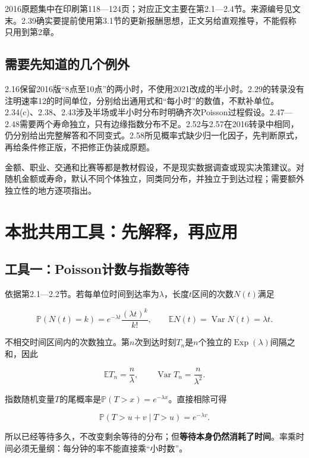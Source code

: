 \documentclass[12pt,a4paper,UTF8,fontset=fandol]{ctexart}
\begin{document}
2016原题集中在印刷第118---124页；对应正文主要在第2.1---2.4节。来源编号见文末。2.39确实要提前使用第3.1节的更新报酬思想，正文另给直观推导，不能假称只用到第2章。

\subsection{需要先知道的几个例外}\label{ux9700ux8981ux5148ux77e5ux9053ux7684ux51e0ux4e2aux4f8bux5916}

2.16保留2016版``8点至10点''的两小时，不使用2021改成的半小时。2.29的转录没有注明速率12的时间单位，分别给出通用式和``每小时''的数值，不默补单位。2.34(c)、2.38、2.43涉及半场或半小时分布时明确齐次Poisson过程假设。2.47---2.48需要两个寿命独立，只有边缘指数分布不足。2.52与2.57在2016转录中相同，仍分别给出完整解答和不同变式。2.58所见概率式缺少归一化因子，先判断原式，再给条件修正版，不把修正伪装成原题。

金额、职业、交通和比赛等都是教材假设，不是现实数据调查或现实决策建议。对随机金额或寿命，默认不同个体独立，同类同分布，并独立于到达过程；需要额外独立性的地方逐项指出。

\section{本批共用工具：先解释，再应用}\label{ux672cux6279ux5171ux7528ux5de5ux5177ux5148ux89e3ux91caux518dux5e94ux7528}

\subsection{工具一：Poisson计数与指数等待}\label{ux5de5ux5177ux4e00poissonux8ba1ux6570ux4e0eux6307ux6570ux7b49ux5f85}

依据第2.1---2.2节。若每单位时间到达率为\(\lambda\)，长度\(t\)区间的次数\(N(t)\)满足

\[
\mathbb P(N(t)=k)=e^{-\lambda t}\frac{(\lambda t)^k}{k!},\qquad
\mathbb EN(t)=\operatorname{Var}N(t)=\lambda t.
\]

不相交时间区间内的次数独立。第\(n\)次到达时刻\(T_n\)是\(n\)个独立的\(\operatorname{Exp}(\lambda)\)间隔之和，因此

\[
\mathbb ET_n=\frac n\lambda,\qquad
\operatorname{Var}T_n=\frac n{\lambda^2}.
\]

指数随机变量\(T\)的尾概率是\(\mathbb P(T>x)=e^{-\lambda x}\)。直接相除可得

\[
\mathbb P(T>u+v\mid T>u)=e^{-\lambda v}.
\]

所以已经等待多久，不改变剩余等待的分布；但\textbf{等待本身仍然消耗了时间}。率乘时间必须无量纲：每分钟的率不能直接乘``小时数''。
\end{document}
